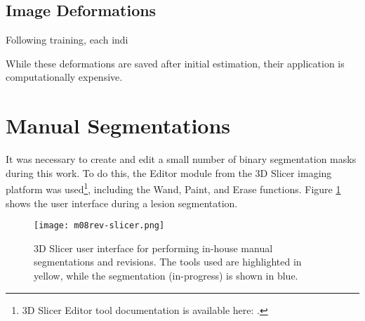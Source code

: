 \subsection{Image Deformations}
Following training, each indi

While these deformations are saved after initial estimation, their application is computationally expensive.
\section{Manual Segmentations}
It was necessary to create and edit a small number of binary segmentation masks during this work. To do this, the Editor module from the 3D Slicer imaging platform \cite{Fedorov2012} was used\footnote{3D Slicer Editor tool documentation is available here: .}, including the Wand, Paint, and Erase functions. Figure \ref{fig:m08-rev-slicer} shows the user interface during a lesion segmentation.
\begin{figure}[h]
  \centering
  \texttt{[image: m08rev-slicer.png]}
  \caption{3D Slicer user interface for performing in-house manual segmentations and revisions. The tools used are highlighted in yellow, while the segmentation (in-progress) is shown in blue.}
  \label{fig:m08-rev-slicer}
\end{figure}
